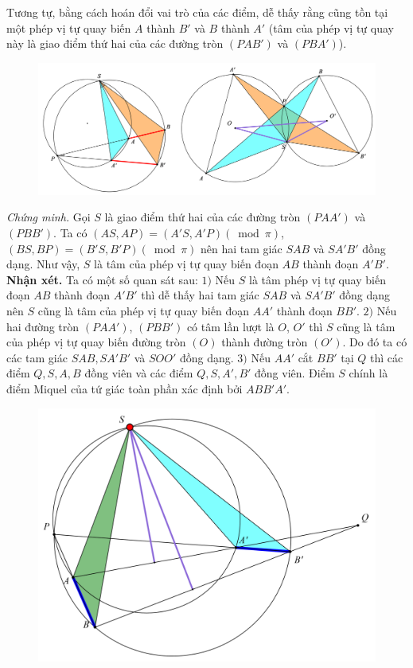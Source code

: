 \begin{multicols}{2}
	\vskip 0.1cm
	Tương tự, bằng cách hoán đổi vai trò của các điểm, dễ thấy rằng cũng tồn tại một phép vị tự quay biến $A$ thành $B'$ và $B$ thành $A'$ (tâm của phép vị tự quay này là giao điểm thứ hai của các đường tròn $(PAB')$ và $(PBA')$).
	\begin{figure}[H]
		\vspace*{-5pt}
		\centering
		\captionsetup{labelformat= empty, justification=centering}
		\includegraphics[width=1\linewidth]{2}
		\vspace*{-20pt}
	\end{figure}
	\textit{Chứng minh.} Gọi $S$ là giao điểm thứ hai của các đường tròn $(PAA')$ và $(PBB')$. Ta có $(AS,AP)=(A'S,A'P) (\bmod  \pi)$, $(BS,BP)=(B'S,B'P)(\bmod  \pi)$ nên hai tam giác $SAB$ và $SA'B'$ đồng dạng. Như vậy, $S$ là tâm của phép vị tự quay biến đoạn $AB$ thành đoạn $A'B'$. 
	\vskip 0.1cm
	\textbf{\color{diendantoanhoc}Nhận xét.}  Ta có một số quan sát sau:
	\vskip 0.1cm
	$1)$ Nếu $S$ là tâm phép vị tự quay biến đoạn $AB$ thành đoạn $A'B'$ thì dễ thấy hai tam giác $SAB$ và $SA'B'$ đồng dạng nên $S$ cũng là tâm của phép vị tự quay biến đoạn $AA'$ thành đoạn $BB'$.
	\vskip 0.1cm 
	$2)$ Nếu hai đường tròn $(PAA')$, $(PBB')$  có tâm lần lượt là $O$, $O'$ thì $S$ cũng là tâm của phép vị tự quay biến đường tròn $(O)$ thành đường tròn $(O')$. Do đó ta có các tam giác $SAB,SA'B'$ và $SOO'$ đồng dạng.
	\vskip 0.1cm
	$3)$ Nếu $AA'$ cắt $BB'$ tại $Q$ thì các điểm $Q,S,A,B$ đồng viên và các điểm $Q,S,A',B'$ đồng viên. Điểm $S$ chính là điểm Miquel của tứ giác toàn phần xác định bởi $ABB'A'$.
	\begin{figure}[H]
		\vspace*{-5pt}
		\centering
		\captionsetup{labelformat= empty, justification=centering}
		\includegraphics[scale=0.75]{3}

\end{figure}
\end{multicols}
